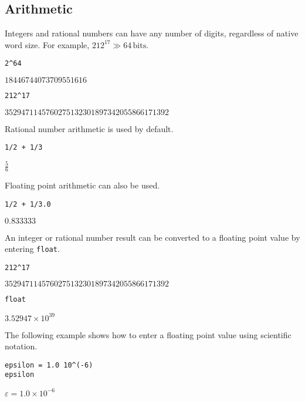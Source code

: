 \subsection{Arithmetic}

\noindent
Integers and rational numbers can have any number of digits,
regardless of native word size.
For example, $212^{17}\gg64\,\text{bits}$.

{\color{blue}
\begin{verbatim}
2^64
\end{verbatim}
}

\noindent
$\displaystyle 18446744073709551616$

{\color{blue}
\begin{verbatim}
212^17
\end{verbatim}
}

\noindent
$\displaystyle 3529471145760275132301897342055866171392$

\bigskip
\noindent
Rational number arithmetic is used by default.

{\color{blue}
\begin{verbatim}
1/2 + 1/3
\end{verbatim}
}

\noindent
$\displaystyle \tfrac{5}{6}$

\bigskip
\noindent
Floating point arithmetic can also be used.

{\color{blue}
\begin{verbatim}
1/2 + 1/3.0
\end{verbatim}
}

\noindent
$\displaystyle 0.833333$

\bigskip
\noindent
An integer or rational number result can be converted to a floating
point value by entering \verb$float$.

{\color{blue}
\begin{verbatim}
212^17
\end{verbatim}
}

\noindent
$\displaystyle 3529471145760275132301897342055866171392$

{\color{blue}
\begin{verbatim}
float
\end{verbatim}
}

\noindent
$\displaystyle 3.52947\times10^{39}$

\bigskip
\noindent
The following example shows how to enter a floating point value
using scientific notation.

{\color{blue}
\begin{verbatim}
epsilon = 1.0 10^(-6)
epsilon
\end{verbatim}
}

\noindent
$\displaystyle \varepsilon=1.0\times10^{-6}$

